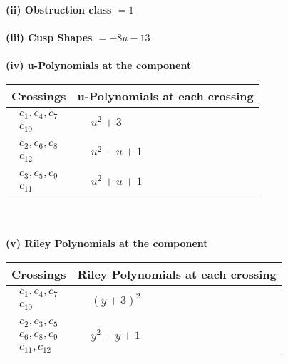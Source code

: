 \documentclass[1p]{elsarticle_modified}
\theoremstyle{definition}
\begin{document}
\flushleft \textbf{(ii) Obstruction class $= 1$}\\~\\
\flushleft \textbf{(iii) Cusp Shapes $= -8 u-13$}\\~\\
\newpage\renewcommand{\arraystretch}{1}
\flushleft \textbf{(iv) u-Polynomials at the component}\newline \\
\begin{tabular}{m{50pt}|m{274pt}}
Crossings & \hspace{64pt}u-Polynomials at each crossing \\
\hline $$\begin{aligned}c_{1},c_{4},c_{7}\\c_{10}\end{aligned}$$&$\begin{aligned}
&u^2+3
\end{aligned}$\\
\hline $$\begin{aligned}c_{2},c_{6},c_{8}\\c_{12}\end{aligned}$$&$\begin{aligned}
&u^2- u+1
\end{aligned}$\\
\hline $$\begin{aligned}c_{3},c_{5},c_{9}\\c_{11}\end{aligned}$$&$\begin{aligned}
&u^2+u+1
\end{aligned}$\\
\hline
\end{tabular}\\~\\
\newpage\renewcommand{\arraystretch}{1}
\flushleft \textbf{(v) Riley Polynomials at the component}\newline \\
\begin{tabular}{m{50pt}|m{274pt}}
Crossings & \hspace{64pt}Riley Polynomials at each crossing \\
\hline $$\begin{aligned}c_{1},c_{4},c_{7}\\c_{10}\end{aligned}$$&$\begin{aligned}
&(y+3)^2
\end{aligned}$\\
\hline $$\begin{aligned}c_{2},c_{3},c_{5}\\c_{6},c_{8},c_{9}\\c_{11},c_{12}\end{aligned}$$&$\begin{aligned}
&y^2+y+1
\end{aligned}$\\
\hline
\end{tabular}\\~\\
\end{document}
